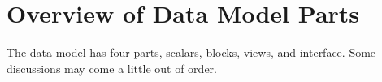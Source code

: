 \section{Overview of Data Model Parts}
The data model has four parts, scalars, blocks, views, and interface.  Some discussions may come a little out of order.




